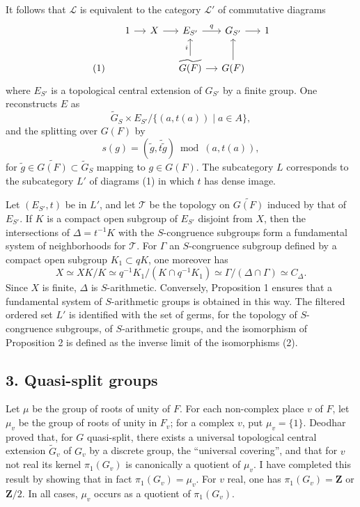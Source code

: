 \documentclass[10pt]{amsart}
\theoremstyle{plain}
\theoremstyle{definition}
\begin{document}
It follows that $\mathscr L$ is equivalent to the category $\mathscr L'$ of commutative diagrams
\[
\begin{tikzcd}[column sep=small]
& 1 \arrow[r] & X \arrow[r] & E_{S'} \arrow[r,"q"] & G_{S'} \arrow[r] & 1 \\
\text{(1)} & & & \widetilde{G(F)} \arrow[u,"i"] \arrow[r] & G(F) \arrow[u] &
\end{tikzcd}
\]
where $E_{S'}$ is a topological central extension of $G_{S'}$ by a finite group. One reconstructs $E$ as
\[
\widetilde G_S\times E_{S'}/\{(a,t(a))\mid a\in A\},
\]
and the splitting over $G(F)$ by
\[
s(g)=(\tilde g,\widetilde{t\tilde g})\bmod (a,t(a)),
\]
for $\tilde g\in\widetilde{G(F)}\subset\widetilde G_S$ mapping to $g\in G(F)$. The subcategory $L$ corresponds to the subcategory $L'$ of diagrams (1) in which $t$ has dense image.

Let $(E_{S'},t)$ be in $L'$, and let $\mathscr T$ be the topology on $\widetilde{G(F)}$ induced by that of $E_{S'}$. If $K$ is a compact open subgroup of $E_{S'}$ disjoint from $X$, then the intersections of $\Delta=t^{-1}K$ with the $S$-congruence subgroups form a fundamental system of neighborhoods for $\mathscr T$. For $\Gamma$ an $S$-congruence subgroup defined by a compact open subgroup $K_1\subset qK$, one moreover has
\begin{equation}\tag{2}
X\simeq XK/K\simeq q^{-1}K_1/(K\cap q^{-1}K_1)\simeq \Gamma/(\Delta\cap\Gamma)\simeq C_\Delta.
\end{equation}
Since $X$ is finite, $\Delta$ is $S$-arithmetic. Conversely, Proposition 1 ensures that a fundamental system of $S$-arithmetic groups is obtained in this way. The filtered ordered set $L'$ is identified with the set of germs, for the topology of $S$-congruence subgroups, of $S$-arithmetic groups, and the isomorphism of Proposition 2 is defined as the inverse limit of the isomorphisms (2).

\subsection*{3. Quasi-split groups}

Let $\mu$ be the group of roots of unity of $F$. For each non-complex place $v$ of $F$, let $\mu_v$ be the group of roots of unity in $F_v$; for a complex $v$, put $\mu_v=\{1\}$. Deodhar proved that, for $G$ quasi-split, there exists a universal topological central extension $\widetilde G_v$ of $G_v$ by a discrete group, the ``universal covering'', and that for $v$ not real its kernel $\pi_1(G_v)$ is canonically a quotient of $\mu_v$. I have completed this result by showing that in fact $\pi_1(G_v)=\mu_v$. For $v$ real, one has $\pi_1(G_v)=\mathbf Z$ or $\mathbf Z/2$. In all cases, $\mu_v$ occurs as a quotient of $\pi_1(G_v)$.
\end{document}
